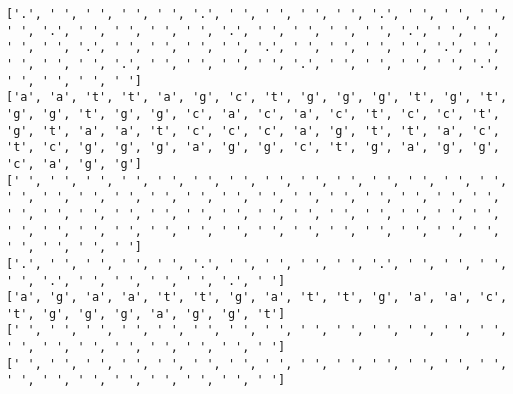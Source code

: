 \documentclass{article}
\begin{document}
\begin{Verbatim}
['.', ' ', ' ', ' ', ' ', '.', ' ', ' ', ' ', ' ', '.', ' ', ' ', ' ', ' ', '.', ' ', ' ', ' ', ' ', '.', ' ', ' ', ' ', ' ', '.', ' ', ' ', ' ', ' ', '.', ' ', ' ', ' ', ' ', '.', ' ', ' ', ' ', ' ', '.', ' ', ' ', ' ', ' ', '.', ' ', ' ', ' ', ' ', '.', ' ', ' ', ' ', ' ', '.', ' ', ' ', ' ', ' ']
['a', 'a', 't', 't', 'a', 'g', 'c', 't', 'g', 'g', 'g', 't', 'g', 't', 'g', 'g', 't', 'g', 'g', 'c', 'a', 'c', 'a', 'c', 't', 'c', 'c', 't', 'g', 't', 'a', 'a', 't', 'c', 'c', 'c', 'a', 'g', 't', 't', 'a', 'c', 't', 'c', 'g', 'g', 'g', 'a', 'g', 'g', 'c', 't', 'g', 'a', 'g', 'g', 'c', 'a', 'g', 'g']
[' ', ' ', ' ', ' ', ' ', ' ', ' ', ' ', ' ', ' ', ' ', ' ', ' ', ' ', ' ', ' ', ' ', ' ', ' ', ' ', ' ', ' ', ' ', ' ', ' ', ' ', ' ', ' ', ' ', ' ', ' ', ' ', ' ', ' ', ' ', ' ', ' ', ' ', ' ', ' ', ' ', ' ', ' ', ' ', ' ', ' ', ' ', ' ', ' ', ' ', ' ', ' ', ' ', ' ', ' ', ' ', ' ', ' ', ' ', ' ']
['.', ' ', ' ', ' ', ' ', '.', ' ', ' ', ' ', ' ', '.', ' ', ' ', ' ', ' ', '.', ' ', ' ', ' ', ' ', '.', ' ']
['a', 'g', 'a', 'a', 't', 't', 'g', 'a', 't', 't', 'g', 'a', 'a', 'c', 't', 'g', 'g', 'g', 'a', 'g', 'g', 't']
[' ', ' ', ' ', ' ', ' ', ' ', ' ', ' ', ' ', ' ', ' ', ' ', ' ', ' ', ' ', ' ', ' ', ' ', ' ', ' ', ' ', ' ']
[' ', ' ', ' ', ' ', ' ', ' ', ' ', ' ', ' ', ' ', ' ', ' ', ' ', ' ', ' ', ' ', ' ', ' ', ' ', ' ', ' ', ' ']
 

\end{Verbatim}
\end{document}
